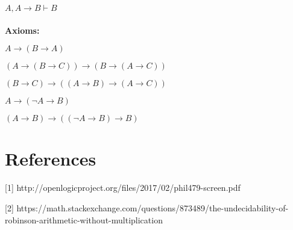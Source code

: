 \documentclass{article}
\begin{document}
$A, A \rightarrow B \vdash B$

\paragraph{}
\textbf{Axioms:}

$A \rightarrow (B \rightarrow A)$

$(A \rightarrow (B \rightarrow C)) \rightarrow (B \rightarrow (A \rightarrow C))$

$(B \rightarrow C) \rightarrow ((A \rightarrow B) \rightarrow (A \rightarrow C))$

$A \rightarrow (\neg A \rightarrow B)$

$(A \rightarrow B) \rightarrow ((\neg A \rightarrow B) \rightarrow B)$

\section{References}
[1] http://openlogicproject.org/files/2017/02/phil479-screen.pdf


[2] https://math.stackexchange.com/questions/873489/the-undecidability-of-robinson-arithmetic-without-multiplication
\end{document}
